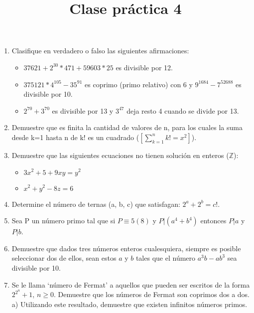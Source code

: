 \documentclass{article}
\title{Clase pr\'actica 4}
\begin{document}
\maketitle
\begin{enumerate}
    \item Clasifique en verdadero o falso las siguientes afirmaciones:
    \begin{itemize} 
        \item $37621 + 2^{30} * 471 + 59603 * 25$ es divisible por 12.
        \item $375121  * 4^{105} - 35^{91}$ es coprimo (primo relativo) con 6 y $9^{1684} - 7^{52688}$ es divisible por 10.
        \item $2^{70} + 3^{70}$ es divisible por 13 y $3^{47}$ deja resto 4 cuando se divide por 13.
    \end{itemize}
    \item Demuestre que es finita la cantidad de valores de n, para los cuales la suma desde k=1 hasta n de k! es un cuadrado ($\left[\sum_{k=1}^{n} k! = x^{2}\right]$).
    \item Demuestre que las siguientes ecuaciones no tienen soluci\'on en enteros ($\mathbb{Z}$):
        \begin{itemize}
            \item $3x^{2} + 5 + 9xy = y^{2}$
            \item $x^{2} + y^{2} - 8z = 6$
        \end{itemize}
    \item Determine el n\'umero de ternas (a, b, c) que satisfagan: $2^{a} + 2^{b} = c!$.
    \item Sea P un n\'umero primo tal que si $P \equiv 5(8)$ y $P| \left( a^{4} + b^{4} \right) $ entonces $P|a$ y $P|b$.
    \item Demuestre que dados tres n\'umeros enteros cualesquiera, siempre es posible seleccionar dos de ellos, sean estos $a$ y $b$ tales que el n\'umero $a^{3}b - ab^{3}$ sea divisible por 10.
    \item Se le llama `n\'umero de Fermat' a aquellos que pueden ser escritos de la forma $2^{2^{n}}+ 1$, $n \geq 0$. Demuestre que los n\'umeros de Fermat son coprimos dos a dos.\\
    a) Utilizando este resultado, demuestre que existen infinitos n\'umeros primos.    
\end{enumerate}
\end{document}
